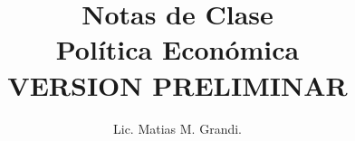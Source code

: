 \documentclass[a4paper,10pt]{article}
\author{Lic. Matias M. Grandi.}
\title{\textbf{\huge{Notas de Clase}} 
\vspace{0.5cm} \\ 
\textbf{\Huge{Política Económica}}\\ 
\vspace{1cm} 
\large{VERSION PRELIMINAR}}
\begin{document}
\maketitle
\begin{center}


\end{center}

\newpage
\tableofcontents
\listoffigures

\newpage



\newpage



\newpage



\newpage


\newpage


\nocite{*}
\end{document}
